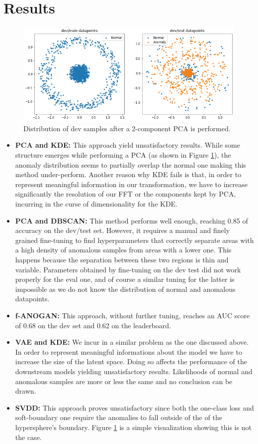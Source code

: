 \documentclass{article}
\begin{document}
\section{Results}
 \begin{figure}
    \centering
    \includegraphics[width=\linewidth]{assets/pca.png}
    \caption{Distribution of dev samples after a 2-component PCA is performed.}
    \label{fig:pca}
\end{figure}
\begin{itemize}
	\item \textbf{PCA and KDE:} This approach yield unsatisfactory results. While some structure emerges while performing a PCA (as shown in Figure \ref{fig:pca}), the anomaly distribution seems to partially overlap the normal one making this method under-perform. Another reason why KDE fails is that, in order to represent meaningful information in our transformation, we have to increase significantly the resolution of our FFT or the components kept by PCA, incurring in the curse of dimensionality for the KDE.
	
	\item \textbf{PCA and DBSCAN:} This method performs well enough, reaching 0.85 of accuracy on the dev/test set. However, it requires a manual and finely grained fine-tuning to find hyperparameters that correctly separate areas with a high density of anomalous samples from areas with a lower one. This happens because the separation between these two regions is thin and variable. Parameters obtained by fine-tuning on the dev test did not work properly for the eval one, and of course a similar tuning for the latter is impossible as we do not know the distribution of normal and anomalous datapoints.
	\item  \textbf{f-ANOGAN:} This approach, without further tuning, reaches an AUC score of 0.68 on the dev set and 0.62 on the leaderboard.
	\item \textbf{VAE and KDE:} We incur in a similar problem as the one discussed above. In order to represent meaningful informations about the model we have to increase the size of the latent space. Doing so affects the performance of the downstream models yielding unsatisfactory results. Likelihoods of normal and anomalous samples are more or less the same and no conclusion can be drawn.
	\item \textbf{SVDD:} This approach proves unsatisfactory since both the one-class loss and soft-boundary one require the anomalies to fall outside of the of the hypersphere's boundary. Figure \ref{fig:pca} is a simple visualization showing this is not the case.

\end{itemize}
\end{document}
